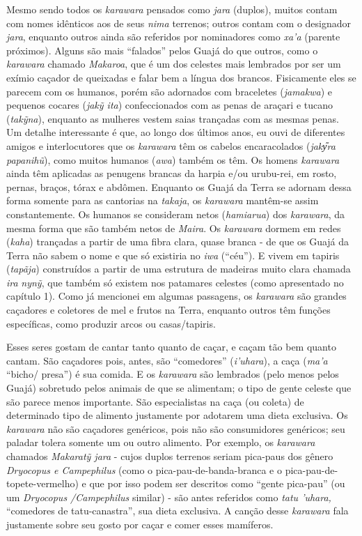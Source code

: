 Mesmo sendo todos os \emph{karawara} pensados como \emph{jara} (duplos),
muitos contam com nomes idênticos aos de seus \emph{nima} terrenos;
outros contam com o designador \emph{jara}, enquanto outros ainda são
referidos por nominadores como \emph{xa'a} (parente próximos). Alguns
são mais ``falados'' pelos Guajá do que outros, como o \emph{karawara}
chamado \emph{Makaroa}, que é um dos celestes mais lembrados por ser um
exímio caçador de queixadas e falar bem a língua dos brancos.
Fisicamente eles se parecem com os humanos, porém são adornados com
braceletes (\emph{jamakwa}) e pequenos cocares (\emph{jakỹ ita})
confeccionados com as penas de araçari e tucano (\emph{takỹna}),
enquanto as mulheres vestem saias trançadas com as mesmas penas. Um
detalhe interessante é que, ao longo dos últimos anos, eu ouvi de
diferentes amigos e interlocutores que os \emph{karawara} têm os cabelos
encaracolados (\emph{jaky᷉ra papanihũ}), como muitos humanos
(\emph{awa}) também os têm. Os homens \emph{karawara} ainda têm
aplicadas as penugens brancas da harpia e/ou urubu-rei, em rosto,
pernas, braços, tórax e abdômen. Enquanto os Guajá da Terra se adornam
dessa forma somente para as cantorias na \emph{takaja}, os
\emph{karawara} mantêm-se assim constantemente. Os humanos se consideram
netos (\emph{hamiarua}) dos \emph{karawara}, da mesma forma que são
também netos de \emph{Maira}. Os \emph{karawara} dormem em redes
(\emph{kaha}) trançadas a partir de uma fibra clara, quase branca - de
que os Guajá da Terra não sabem o nome e que só existiria no \emph{iwa}
(``céu''). E vivem em tapiris (\emph{tapãja}) construídos a partir de
uma estrutura de madeiras muito clara chamada \emph{ira} \emph{nynỹ},
que também só existem nos patamares celestes (como apresentado no
capítulo 1). Como já mencionei em algumas passagens, os \emph{karawara}
são grandes caçadores e coletores de mel e frutos na Terra, enquanto
outros têm funções específicas, como produzir arcos ou casas/tapiris.

Esses seres gostam de cantar tanto quanto de caçar, e caçam tão bem
quanto cantam. São caçadores pois, antes, são ``comedores''
(\emph{i'uhara}), a caça (\emph{ma'a} ``bicho/ presa'') é sua comida. E
os \emph{karawara} são lembrados (pelo menos pelos Guajá) sobretudo
pelos animais de que se alimentam; o tipo de gente celeste que são
parece menos importante. São especialistas na caça (ou coleta) de
determinado tipo de alimento justamente por adotarem uma dieta
exclusiva. Os \emph{karawara} não são caçadores genéricos, pois não são
consumidores genéricos; seu paladar tolera somente um ou outro alimento.
Por exemplo, os \emph{karawara} chamados \emph{Makaratỹ jara} - cujos
duplos terrenos seriam pica-paus dos gênero \emph{Dryocopus e
Campephilus} (como o pica-pau-de-banda-branca e o
pica-pau-de-topete-vermelho) e que por isso podem ser descritos como
``gente pica-pau'' (ou um \emph{Dryocopus /Campephilus} similar) - são
antes referidos como \emph{tatu 'uhara,} ``comedores de tatu-canastra'',
sua dieta exclusiva. A canção desse \emph{karawara} fala justamente
sobre seu gosto por caçar e comer esses mamíferos.

